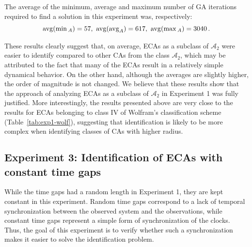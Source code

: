 The average of the minimum, average and maximum number of GA iterations required to find a solution in this experiment was, respectively:
\[\avg(\min{}_A) = 57,\ \avg(\avg_A) = 617,\ \avg(\max{}_A) = 3040\,.\]

These results clearly suggest that, on average, ECAs as a subclass of $\mathcal{A}_2$ were easier to identify compared to other CAs from the class $\mathcal{A}_2$, which may be attributed to the fact that many of the ECAs result in a relatively simple dynamical behavior. On the other hand, although the averages are slightly higher, the order of magnitude is not changed. We believe that these results show that the approach of analyzing ECAs as a subclass of $\mathcal{A}_2$ in Experiment 1 was fully justified. More interestingly, the results presented above are very close to the results for ECAs belonging to class IV of Wolfram's classification scheme (Table~\ref{tab:exp1-wolf}), suggesting that identification is likely to be more complex when identifying classes of CAs with higher radius.

\subsection{Experiment 3: Identification of ECAs with constant time gaps}
While the time gaps had a random length in Experiment 1, they are kept constant in this experiment. Random time gaps correspond to a lack of temporal synchronization between the observed system and the observations, while constant time gaps represent a simple form of synchronization of the clocks. Thus, the goal of this experiment is to verify whether such a synchronization makes it easier to solve the identification problem.

